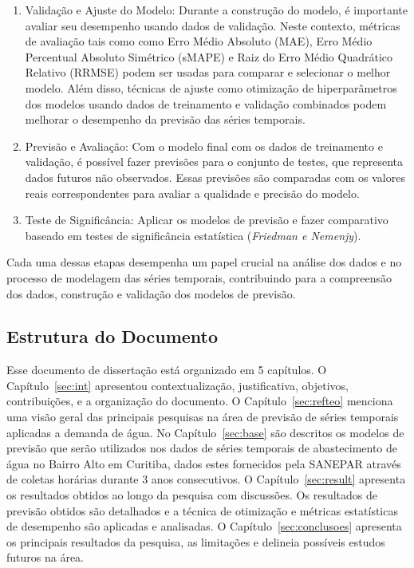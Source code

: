 \begin{enumerate}
	\item {Validação e Ajuste do Modelo}: Durante a construção do modelo, é importante avaliar seu desempenho usando dados de validação. Neste contexto, métricas de avaliação tais como como Erro Médio Absoluto (MAE), Erro Médio Percentual Absoluto Simétrico (sMAPE) e Raiz do Erro Médio Quadrático Relativo (RRMSE) podem ser usadas para comparar e selecionar o melhor modelo. Além disso, técnicas de ajuste como otimização de hiperparâmetros dos modelos usando dados de treinamento e validação combinados podem melhorar o desempenho da previsão das séries temporais.
	
	\item {Previsão e Avaliação}: Com o modelo final com os dados de treinamento e validação, é possível fazer previsões para o conjunto de testes, que representa dados futuros não observados. Essas previsões são comparadas com os valores reais correspondentes para avaliar a qualidade e precisão do modelo.
	
	\item {Teste de Significância}: Aplicar os modelos de previsão e fazer comparativo baseado em testes de significância estatística (\textit{Friedman e Nemenjy}).
	
	
	
\end{enumerate}

Cada uma dessas etapas desempenha um papel crucial na análise dos dados e no processo de modelagem das séries temporais, contribuindo para a compreensão dos dados, construção e validação dos modelos de previsão.

\subsection{Estrutura do Documento} \label{subsec:estrutura}

Esse documento de dissertação está organizado em 5 capítulos. O Capítulo~\ref{sec:int}  apresentou contextualização, justificativa, objetivos, contribuições, e a organização do documento.  O Capítulo~\ref{sec:refteo} menciona uma visão geral das principais pesquisas na área de previsão de séries temporais aplicadas a demanda de água. No Capítulo~\ref{sec:base} são descritos os modelos de previsão que serão utilizados nos dados de séries temporais de abastecimento de água no Bairro Alto em Curitiba, dados estes fornecidos pela SANEPAR através de coletas horárias durante 3 anos consecutivos. O Capítulo~\ref{sec:result} apresenta os resultados obtidos ao longo da pesquisa com discussões. Os resultados de previsão obtidos são detalhados e a técnica de otimização e métricas estatísticas de desempenho são aplicadas e analisadas. O Capítulo~\ref{sec:conclusoes} apresenta os principais resultados da pesquisa, as limitações e delineia possíveis estudos futuros na área. 
